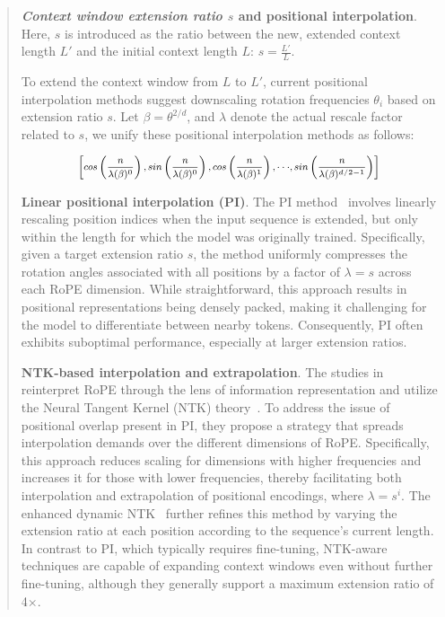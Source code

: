 \begin{abstract}
\textbf{\emph{Context window extension ratio $s$} and positional interpolation}. Here, $s$ is introduced as the ratio between the new, extended context length $L'$ and the initial context length $L$: $s=\frac{L'}{L}$.

To extend the context window from $L$ to $L'$, current positional interpolation methods suggest downscaling rotation frequencies $\theta_i$ based on extension ratio $s$. Let $\beta=\theta^{2/d}$, and $\lambda$ denote the actual rescale factor related to $s$, we   unify these positional interpolation methods as follows:

\begin{equation}	
	\fontsize{7.5}{7.5} \selectfont
	\label{eq:unified_rope}
	\begin{aligned}
		\left[cos\left(\frac{n}{\lambda(\beta)^0}\right), sin \left(\frac{n}{\lambda(\beta)^0}\right), cos\left(\frac{n}{\lambda(\beta)^1}\right), \cdot\cdot\cdot,  sin \left(\frac{n}{\lambda(\beta)^{d/2-1}}\right) \right]   
	\end{aligned}
\end{equation}

\textbf{Linear positional interpolation (PI)}. The PI method~\cite{pi} involves linearly rescaling position indices when the input sequence is extended, but only within the length for which the model was originally trained. Specifically, given a target extension ratio $s$, the method uniformly compresses the rotation angles associated with all positions by a factor of $\lambda = s$ across each RoPE dimension. While straightforward, this approach results in positional representations being densely packed, making it challenging for the model to differentiate between nearby tokens. Consequently, PI often exhibits suboptimal performance, especially at larger extension ratios.

\textbf{NTK-based interpolation and extrapolation}. The studies in ~\cite{ntk,dynamicntk} reinterpret RoPE through the lens of information representation and utilize the Neural Tangent Kernel (NTK) theory~\cite{jacot2018neural,tancik2020fourier}. To address the issue of positional overlap present in PI, they propose a strategy that spreads interpolation demands over the different dimensions of RoPE. Specifically, this approach reduces scaling for dimensions with higher frequencies and increases it for those with lower frequencies, thereby facilitating both interpolation and extrapolation of positional encodings, where $\lambda=s^{i}$. The enhanced dynamic NTK~\cite{dynamicntk} further refines this method by varying the extension ratio at each position according to the sequence’s current length. In contrast to PI, which typically requires fine-tuning, NTK-aware techniques are capable of expanding context windows even without further fine-tuning, although they generally support a maximum extension ratio of 4$\times$.


\end{abstract}
